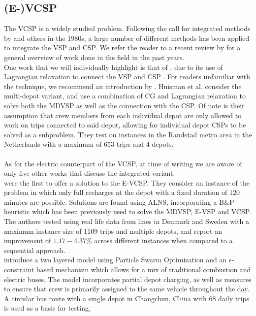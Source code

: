 \documentclass[]{article}
\begin{document}
\subsection{(E-)VCSP}
The VCSP is a widely studied problem. Following the call for integrated methods by \citet{Bodin1983} and others in the 1980s, a large number of different methods has been applied to integrate the VSP and CSP. We refer the reader to a recent review by \citet{Ge2024} for a general overview of work done in the field in the past years. \\
One work that we will individually highlight is that of \citet{Huisman2005}, due to its use of Lagrangian relaxation to connect the VSP and CSP . For readers unfamiliar with the technique, we recommend an introduction by \citet{Beasley1993}. Huisman et al. consider the multi-depot variant, and use a combination of CG and Lagrangian relaxation to solve both the MDVSP as well as the connection with the CSP. Of note is their assumption that crew members from each individual depot are only allowed to work on trips connected to said depot, allowing for individual depot CSPs to be solved as a subproblem. They test on instances in the Randstad metro area in the Netherlands with a maximum of 653 trips and 4 depots. \\\\
As for the electric counterpart of the VCSP, at time of writing we are aware of only five other works that discuss the integrated variant. \\
\citet{Perumal2021} were the first to offer a solution to the E-VCSP. They consider an instance of the problem in which only full recharges at the depot with a fixed duration of 120 minutes are possible. Solutions are found using ALNS, incorporating a B\&P heuristic which has been previously used to solve the MDVSP, E-VSP and VCSP. The authors tested using real life data from lines in Denmark and Sweden with a
maximum instance size of 1109 trips and multiple depots, and report an improvement of $1.17-4.37\%$
across different instances when compared to a sequential approach. \\
\citet{Wang2022} introduce a two layered model using Particle Swarm Optimization and an
$\epsilon$-constraint based mechanism which allows for a mix of traditional
combustion and electric buses. The model incorporates partial
depot charging, as well as measures to ensure that crew is primarily assigned
to the same vehicle throughout the day. A circular bus route with a single
depot in Changchun, China with 68 daily trips is used as a basis for testing,
\end{document}
